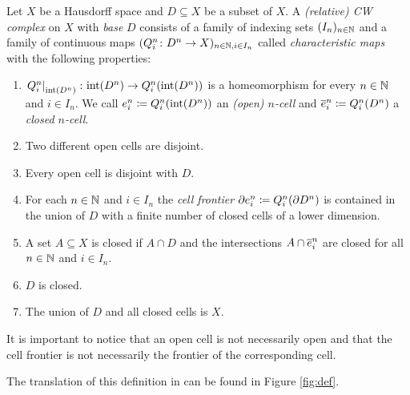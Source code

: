 \begin{defi}\label{def:cwcomplex}
    Let $X$ be a Hausdorff space and $D \subseteq X$ be a subset of $X$. 
    A \emph{(relative) CW complex} on $X$ with \emph{base} $D$ consists of a family of indexing sets $(I_n)_{n \in \bN}$ and a family of continuous maps $(Q_i^n \colon D^n \to X)_{n \in \bN, i \in I_n}$ called \emph{characteristic maps} with the following properties: 
    \begin{enumerate}
        \item $\restrict{Q_i^n}{\interior{D^n}} \colon \interior{D^n} \to Q_i^n(\interior{D^n})$ is a homeomorphism for every $n \in \bN$ and $i \in I_n$. We call $\openCell{n}{i} \coloneq Q_i^n(\interior{D^n})$ an \emph{(open) $n$-cell} and $\closedCell{n}{i} \coloneq Q_i^n(D^n)$ a \emph{closed $n$-cell}.
        \item Two different open cells are disjoint.
        \item Every open cell is disjoint with $D$.
        \item For each $n \in \bN$ and $i \in I_n$ the \emph{cell frontier} $\cellFrontier{n}{i} \coloneq Q_i^n(\boundary D^n)$ is contained in the union of $D$ with a finite number of closed cells of a lower dimension.
        \item A set $A \subseteq X$ is closed if $A \cap D$ and the intersections $A \cap \closedCell{n}{i}$ are closed for all $n \in \bN$ and $i \in I_n$.
        \item $D$ is closed. 
        \item The union of $D$ and all closed cells is $X$.
    \end{enumerate}
\end{defi}

It is important to notice that an open cell is not necessarily open and that the cell frontier is not necessarily the frontier of the corresponding cell.

The translation of this definition in \mathlib can be found in Figure \ref{fig:def}.

